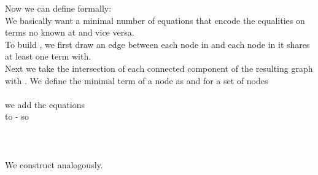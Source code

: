 Now we can define  formally:\\
We basically want a minimal number of equations that encode the equalities on  terms no known at  and vice versa.\\
To build , we first draw an edge between each node in  and each node in  it shares at least one term with.\\
Next we take the intersection  of each connected component of the resulting graph with .
We define the minimal  term of a node  as  and for a set of nodes  \\
\\
we add the equations \\
 to  - so \\
 \\
\\
\\
We construct  analogously.

